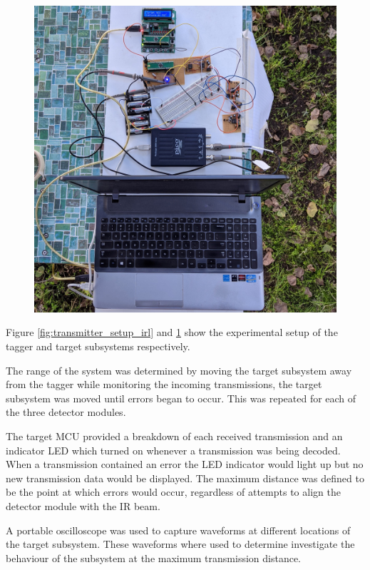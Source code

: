 \begin{figure}[H]
\begin{minipage}{.48\textwidth}
		\includegraphics[width=.9\linewidth]{figures/experimentation/receiver_setup_irl_crop.jpg}
		\label{fig:receiver_setup_irl}
	\end{minipage}
\end{figure}

Figure \ref{fig:transmitter_setup_irl} and \ref{fig:receiver_setup_irl} show the experimental setup of the tagger and target subsystems respectively.

The range of the system was determined by moving the target subsystem away from the tagger while monitoring the incoming transmissions, the target subsystem was moved until errors began to occur. This was repeated for each of the three detector modules.

The target MCU provided a breakdown of each received transmission and an indicator LED which turned on whenever a transmission was being decoded. When a transmission contained an error the LED indicator would light up but no new transmission data would be displayed. The maximum distance was defined to be the point at which errors would occur, regardless of attempts to align the detector module with the IR beam.

A portable oscilloscope was used to capture waveforms at different locations of the target subsystem. These waveforms where used to determine investigate the behaviour of the subsystem at the maximum transmission distance.


